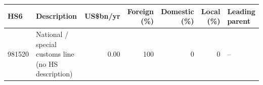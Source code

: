 \begin{tabular}{@{}l p{6.4cm} r r r r l@{}}
\toprule
HS6 & Description & US\$bn/yr & Foreign (\%) & Domestic (\%) & Local (\%) & Leading parent \\
\midrule
981520 & National /\allowbreak{} special customs line (no HS description) & 0.00 & 100 & 0 & 0 & -- \\
\bottomrule
\end{tabular}
